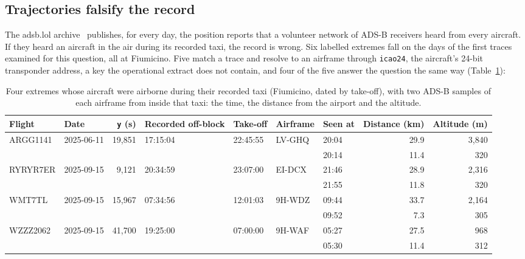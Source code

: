 \documentclass[
  manuscript=article,
  layout=preprint,
  year=2026,
  volume=x,
]{extra/joas}
\begin{document}
\subsection{Trajectories falsify the record}\label{sec:4.2}

The adsb.lol archive~\cite{adsblol} publishes, for every day, the position reports that a volunteer network of ADS-B receivers heard from every aircraft. If they heard an aircraft in the air during its recorded taxi, the record is wrong. Six labelled extremes fall on the days of the first traces examined for this question, all at Fiumicino. Five match a trace and resolve to an airframe through \texttt{icao24}, the aircraft's 24-bit transponder address, a key the operational extract does not contain, and four of the five answer the question the same way (Table~\ref{tab:3}):

\begin{table}[htbp!]
  \centering
  \small
  \setlength{\tabcolsep}{1.9pt}\renewcommand{\arraystretch}{1.15}
  \caption{Four extremes whose aircraft were airborne during their recorded taxi (Fiumicino, dated by take-off), with two ADS-B samples of each airframe from inside that taxi: the time, the distance from the airport and the altitude.}
  \label{tab:3}
  \begin{tabular*}{\linewidth}{@{\extracolsep{\fill}}llrllllrr}
  \toprule
  \textbf{Flight} & \textbf{Date} & \textbf{\texttt{y} (s)} & \textbf{Recorded off-block} & \textbf{Take-off} & \textbf{Airframe} & \textbf{Seen at} & \textbf{Distance (km)} & \textbf{Altitude (m)} \\
  \midrule
  ARGG1141 & 2025-06-11 & 19,851 & 17:15:04 & 22:45:55 & LV-GHQ & 20:04 & 29.9 & 3,840 \\
   &  &  &  &  &  & 20:14 & 11.4 & 320 \\
  \addlinespace
  RYRYR7ER & 2025-09-15 & 9,121 & 20:34:59 & 23:07:00 & EI-DCX & 21:46 & 28.9 & 2,316 \\
   &  &  &  &  &  & 21:55 & 11.8 & 320 \\
  \addlinespace
  WMT7TL & 2025-09-15 & 15,967 & 07:34:56 & 12:01:03 & 9H-WDZ & 09:44 & 33.7 & 2,164 \\
   &  &  &  &  &  & 09:52 & 7.3 & 305 \\
  \addlinespace
  WZZZ2062 & 2025-09-15 & 41,700 & 19:25:00 & 07:00:00 & 9H-WAF & 05:27 & 27.5 & 968 \\
   &  &  &  &  &  & 05:30 & 11.4 & 312 \\
  \bottomrule
  \end{tabular*}
\end{table}
\end{document}
